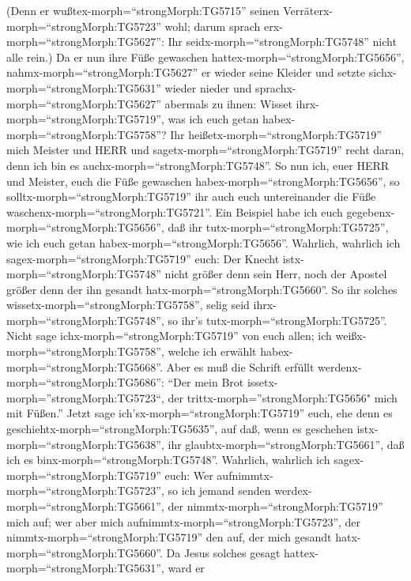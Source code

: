(Denn er wußtex-morph=``strongMorph:TG5715'' seinen
Verräterx-morph=``strongMorph:TG5723'' wohl; darum sprach
erx-morph=``strongMorph:TG5627'': Ihr seidx-morph=``strongMorph:TG5748''
nicht alle rein.)  Da er nun ihre Füße gewaschen
hattex-morph=``strongMorph:TG5656'', nahmx-morph=``strongMorph:TG5627''
er wieder seine Kleider und setzte sichx-morph=``strongMorph:TG5631''
wieder nieder und sprachx-morph=``strongMorph:TG5627'' abermals zu
ihnen: Wisset ihrx-morph=``strongMorph:TG5719'', was ich euch getan
habex-morph=``strongMorph:TG5758''?  Ihr
heißetx-morph=``strongMorph:TG5719'' mich Meister und HERR und
sagetx-morph=``strongMorph:TG5719'' recht daran, denn ich bin es
auchx-morph=``strongMorph:TG5748''.  So nun ich, euer HERR
und Meister, euch die Füße gewaschen habex-morph=``strongMorph:TG5656'',
so solltx-morph=``strongMorph:TG5719'' ihr auch euch untereinander die
Füße waschenx-morph=``strongMorph:TG5721''.  Ein Beispiel
habe ich euch gegebenx-morph=``strongMorph:TG5656'', daß ihr
tutx-morph=``strongMorph:TG5725'', wie ich euch getan
habex-morph=``strongMorph:TG5656''.  Wahrlich, wahrlich ich
sagex-morph=``strongMorph:TG5719'' euch: Der Knecht
istx-morph=``strongMorph:TG5748'' nicht größer denn sein Herr, noch der
Apostel größer denn der ihn gesandt hatx-morph=``strongMorph:TG5660''.
 So ihr solches wissetx-morph=``strongMorph:TG5758'', selig
seid ihrx-morph=``strongMorph:TG5748'', so ihr's
tutx-morph=``strongMorph:TG5725''.  Nicht sage
ichx-morph=``strongMorph:TG5719'' von euch allen; ich
weißx-morph=``strongMorph:TG5758'', welche ich erwählt
habex-morph=``strongMorph:TG5668''. Aber es muß die Schrift erfüllt
werdenx-morph=``strongMorph:TG5686'': ``Der mein Brot
issetx-morph=''strongMorph:TG5723``, der
trittx-morph=''strongMorph:TG5656" mich mit Füßen.''  Jetzt
sage ich'sx-morph=``strongMorph:TG5719'' euch, ehe denn es
geschiehtx-morph=``strongMorph:TG5635'', auf daß, wenn es geschehen
istx-morph=``strongMorph:TG5638'', ihr
glaubtx-morph=``strongMorph:TG5661'', daß ich es
binx-morph=``strongMorph:TG5748''.  Wahrlich, wahrlich ich
sagex-morph=``strongMorph:TG5719'' euch: Wer
aufnimmtx-morph=``strongMorph:TG5723'', so ich jemand senden
werdex-morph=``strongMorph:TG5661'', der
nimmtx-morph=``strongMorph:TG5719'' mich auf; wer aber mich
aufnimmtx-morph=``strongMorph:TG5723'', der
nimmtx-morph=``strongMorph:TG5719'' den auf, der mich gesandt
hatx-morph=``strongMorph:TG5660''.  Da Jesus solches gesagt
hattex-morph=``strongMorph:TG5631'', ward er
